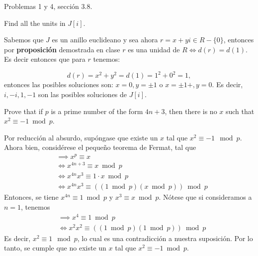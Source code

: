




Problemas 1 y 4, sección 3.8.


\begin{problema}[Problema 1]
    Find all the units in $J[i]$.
    \begin{dem}
        Sabemos que $J$ es un anillo euclideano y sea ahora $r=x+yi\in R-\{0\}$, entonces por \textbf{proposición} demostrada en clase $r$ es una unidad de $R\iff d(r)=d(1)$. Es decir entonces que para $r$ tenemos:

        $$d(r)=x^2+y^2 = d(1)=1^2+0^2=1,$$
        entonces las posibles soluciones son: $x=0,y=\pm 1$ o $x=\pm 1+,y=0$. Es decir, $i,-i,1,-1$ son las posibles soluciones de $J[i]$.
    \end{dem}
\end{problema}

\begin{problema}[Problema 4]
    Prove that if $p$ is a prime number of the form $4 n+3$, then there is no $x$ such that $x^2 \equiv-1 \bmod p$.
    \begin{dem}
        Por reducción al absurdo, supóngase que existe un $x$ tal que $x^2\equiv -1\mod p$. Ahora bien, considérese el pequeño teorema de Fermat, tal que 
        \begin{align*}
            &\implies x^p \equiv x\\
            &\iff x^{4n+3}\equiv x \bmod p\\
            &\iff x^{4n}x^3 \equiv 1\cdot x \bmod p\\
            &\iff x^{4n}x^3 \equiv ((1\bmod p)(x \bmod p)) \bmod p
        \end{align*}
        Entonces, se tiene $x^{4n} \equiv 1\bmod p$ y $x^3\equiv x \bmod p$. Nótese que si consideramos a $n=1$, tenemos 
        \begin{align*}
            &\implies x^4 \equiv 1\bmod p\\
            &\iff x^{2}x^2 \equiv ((1\bmod p)(1 \bmod p)) \bmod p
        \end{align*}
        Es decir, $x^2 \equiv 1\mod p$, lo cual es una contradicción a nuestra suposición. Por lo tanto, se cumple que no existe un $x$ tal que $x^2\equiv -1\bmod p$.
    \end{dem}
\end{problema}

%
%


